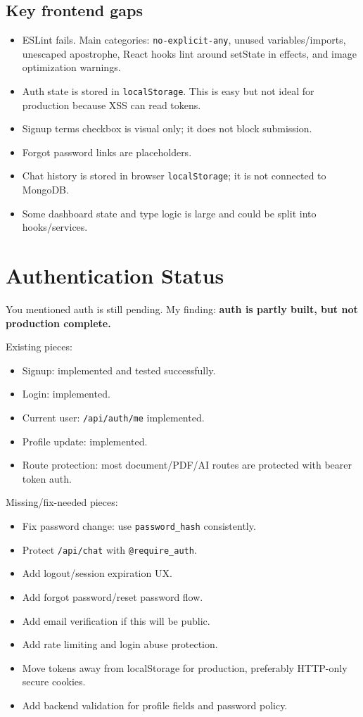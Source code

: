 \documentclass[11pt]{article}
\begin{document}
\subsection{Key frontend gaps}
\begin{itemize}
  \item ESLint fails. Main categories: \texttt{no-explicit-any}, unused variables/imports, unescaped apostrophe, React hooks lint around setState in effects, and image optimization warnings.
  \item Auth state is stored in \texttt{localStorage}. This is easy but not ideal for production because XSS can read tokens.
  \item Signup terms checkbox is visual only; it does not block submission.
  \item Forgot password links are placeholders.
  \item Chat history is stored in browser \texttt{localStorage}; it is not connected to MongoDB.
  \item Some dashboard state and type logic is large and could be split into hooks/services.
\end{itemize}

\section{Authentication Status}

You mentioned auth is still pending. My finding: \textbf{auth is partly built, but not production complete.}

Existing pieces:
\begin{itemize}
  \item Signup: implemented and tested successfully.
  \item Login: implemented.
  \item Current user: \texttt{/api/auth/me} implemented.
  \item Profile update: implemented.
  \item Route protection: most document/PDF/AI routes are protected with bearer token auth.
\end{itemize}

Missing/fix-needed pieces:
\begin{itemize}
  \item Fix password change: use \texttt{password\_hash} consistently.
  \item Protect \texttt{/api/chat} with \texttt{@require\_auth}.
  \item Add logout/session expiration UX.
  \item Add forgot password/reset password flow.
  \item Add email verification if this will be public.
  \item Add rate limiting and login abuse protection.
  \item Move tokens away from localStorage for production, preferably HTTP-only secure cookies.
  \item Add backend validation for profile fields and password policy.
\end{itemize}
\end{document}

